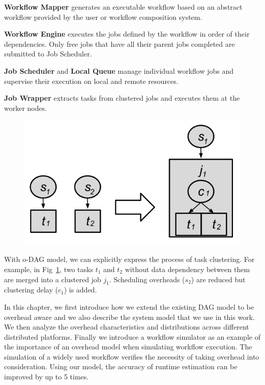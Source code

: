 \textbf{Workflow Mapper} generates an executable workflow based on an abstract workflow provided by the user or workflow composition system. 

\textbf{Workflow Engine} executes the jobs defined by the workflow in order of their dependencies. Only free jobs that have all their parent jobs completed are submitted to  Job Scheduler. 

\textbf{Job Scheduler} and \textbf{Local Queue} manage individual workflow jobs and supervise their execution on local and remote resources.

\textbf{Job Wrapper} extracts tasks from clustered jobs and executes them at the worker nodes. 


\begin{figure}[h!]
\centering
 \includegraphics[width=0.6\linewidth]{figures/introduction/hc.png}
  \label{fig:intro_hc}
\end{figure}



With o-DAG model, we can explicitly express the process of task clustering. For example, in Fig~\ref{fig:intro_hc}, two tasks $t_1$ and $t_2$ without data dependency between them are merged into a clustered job $j_1$. Scheduling overheads ($s_2$) are reduced but clustering delay ($c_1$) is added. 



In this chapter, we first introduce how we extend the existing DAG model to be overhead aware and we also describe the system model that we use in this work. We then analyze the overhead characteristics and distributions across different distributed platforms. Finally we introduce a workflow simulator as an example of the importance of an overhead model when simulating workflow execution. The simulation of a widely used workflow verifies the necessity of taking overhead into consideration. Using our model, the accuracy of runtime estimation can be improved by up to 5 times. 

